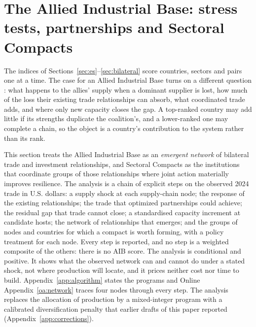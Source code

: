 \section{The Allied Industrial Base: stress tests, partnerships and Sectoral Compacts}
\label{sec:network}

The indices of Sections~\ref{sec:es}--\ref{sec:bilateral} score countries, sectors and pairs one at
a time. The case for an Allied Industrial Base turns on a different question
\citep{neis2026allied}: what happens to the allies' supply when a dominant supplier is lost, how much
of the loss their existing trade relationships can absorb, what coordinated trade adds, and where
only new capacity closes the gap. A top-ranked country may add little if its strengths duplicate the
coalition's, and a lower-ranked one may complete a chain, so the object is a country's contribution
to the system rather than its rank.

This section treats the Allied Industrial Base as an \emph{emergent network} of bilateral trade and
investment relationships, and Sectoral Compacts as the institutions that coordinate groups of those
relationships where joint action materially improves resilience. The analysis is a chain of
explicit steps on the observed 2024 trade in U.S. dollars: a supply shock at each supply-chain node;
the response of the existing relationships; the trade that optimized partnerships could achieve; the
residual gap that trade cannot close; a standardised capacity increment at candidate hosts; the
network of relationships that emerges; and the groups of nodes and countries for which a compact is
worth forming, with a policy treatment for each node. Every step is reported, and no step is a
weighted composite of the others: there is no AIB score. The analysis is conditional and positive.
It shows what the observed network can and cannot do under a stated shock, not where production will
locate, and it prices neither cost nor time to build. Appendix~\ref{app:algorithm} states the
programs and Online Appendix~\ref{oa:network} traces four nodes through every step. The analysis
replaces the allocation of production by a mixed-integer program with a calibrated diversification
penalty that earlier drafts of this paper reported (Appendix~\ref{app:corrections}).

